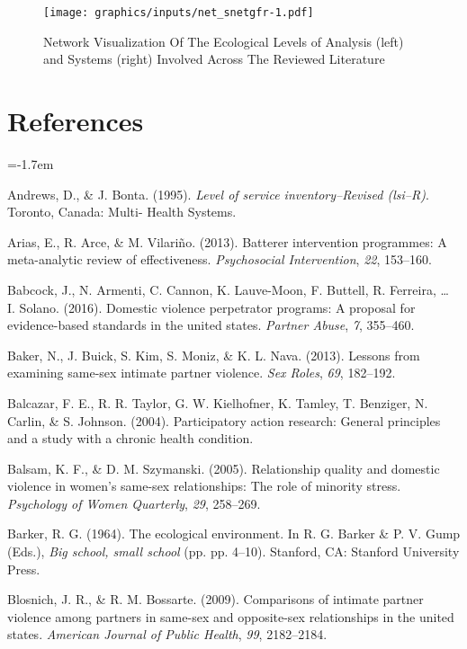 \documentclass[11pt,]{tufte-book}
\newcommand{\refs}{
    \parindent=-1.7em\
    \
    \setlength{\parskip}{0.5\baselineskip}
}
\begin{document}
\newpage

\begin{figure}
\centering
\texttt{[image: graphics/inputs/net\_snetgfr-1.pdf]}
\caption{Network Visualization Of The Ecological Levels of Analysis
(left) and Systems (right) Involved Across The Reviewed
Literature\label{fig:sysnet}}
\end{figure}

\chapter{References}\label{references}

\refs

\hypertarget{refs}{}
\hypertarget{ref-andrews1994level}{}
Andrews, D., \& J. Bonta. (1995). \emph{Level of service
inventory--Revised (lsi--R)}. Toronto, Canada: Multi- Health Systems.

\hypertarget{ref-arias2013batterer}{}
Arias, E., R. Arce, \& M. Vilariño. (2013). Batterer intervention
programmes: A meta-analytic review of effectiveness. \emph{Psychosocial
Intervention}, \emph{22}, 153--160.

\hypertarget{ref-babcock2016domestic}{}
Babcock, J., N. Armenti, C. Cannon, K. Lauve-Moon, F. Buttell, R.
Ferreira, \ldots{} I. Solano. (2016). Domestic violence perpetrator
programs: A proposal for evidence-based standards in the united states.
\emph{Partner Abuse}, \emph{7}, 355--460.

\hypertarget{ref-baker2013lessons}{}
Baker, N., J. Buick, S. Kim, S. Moniz, \& K. L. Nava. (2013). Lessons
from examining same-sex intimate partner violence. \emph{Sex Roles},
\emph{69}, 182--192.

\hypertarget{ref-balcazar2004participatory}{}
Balcazar, F. E., R. R. Taylor, G. W. Kielhofner, K. Tamley, T. Benziger,
N. Carlin, \& S. Johnson. (2004). Participatory action research: General
principles and a study with a chronic health condition.

\hypertarget{ref-balsam2005relationship}{}
Balsam, K. F., \& D. M. Szymanski. (2005). Relationship quality and
domestic violence in women's same-sex relationships: The role of
minority stress. \emph{Psychology of Women Quarterly}, \emph{29},
258--269.

\hypertarget{ref-barker1964ecological}{}
Barker, R. G. (1964). The ecological environment. In R. G. Barker \& P.
V. Gump (Eds.), \emph{Big school, small school} (pp. pp. 4--10).
Stanford, CA: Stanford University Press.

\hypertarget{ref-blosnich2009comparisons}{}
Blosnich, J. R., \& R. M. Bossarte. (2009). Comparisons of intimate
partner violence among partners in same-sex and opposite-sex
relationships in the united states. \emph{American Journal of Public
Health}, \emph{99}, 2182--2184.
\end{document}
